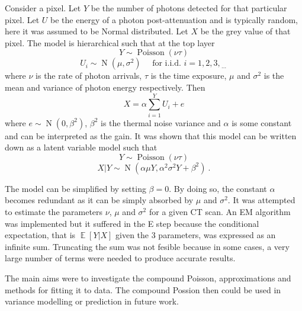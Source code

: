 \documentclass[a4paper]{proc}
\DeclareMathOperator{\expectation}{\mathbb{E}}
\DeclareMathOperator{\normal}{N}
\DeclareMathOperator{\poisson}{Poisson}
\newcommand{\dotdotdot}{_{\phantom{.}\cdots}}
\begin{document}
Consider a pixel. Let $Y$ be the number of photons detected for that particular pixel. Let $U$ be the energy of a photon post-attenuation and is typically random, here it was assumed to be Normal distributed. Let $X$ be the grey value of that pixel. The model is hierarchical such that at the top layer
\begin{equation}
Y\sim\poisson\left(\nu\tau\right)
\end{equation}
\begin{equation}
U_i\sim\normal\left(\mu,\sigma^2\right) \quad \text{ for i.i.d. }i=1,2,3,\dotdotdot
\end{equation}
where $\nu$ is the rate of photon arrivals, $\tau$ is the time exposure, $\mu$ and $\sigma^2$ is the mean and variance of photon energy respectively. Then
\begin{equation}
X = \alpha\sum_{i=1}^Y U_i + e
\end{equation}
where $e\sim\normal(0,\beta^2)$, $\beta^2$ is the thermal noise variance and $\alpha$ is some constant and can be interpreted as the gain. It was shown that this model can be written down as a latent variable model such that 
\begin{equation}
Y\sim\poisson\left(\nu\tau\right)
\end{equation}
\begin{equation}
X|Y\sim\normal\left(\alpha\mu Y, \alpha^2\sigma^2 Y + \beta^2\right) \ .
\end{equation}

The model can be simplified by setting $\beta=0$. By doing so, the constant $\alpha$ becomes redundant as it can be simply absorbed by $\mu$ and $\sigma^2$. It was attempted to estimate the parameters $\nu$, $\mu$ and $\sigma^2$ for a given CT scan. An EM algorithm \cite{dempster1977maximum} was implemented but it suffered in the E step because the conditional expectation, that is $\expectation\left[Y|X\right]$ given the 3 parameters, was expressed as an infinite sum. Truncating the sum was not fesible because in some cases, a very large number of terms were needed to produce accurate results.

The main aims were to investigate the compound Poisson, approximations and methods for fitting it to data. The compound Possion then could be used in variance modelling or prediction in future work.
\end{document}
